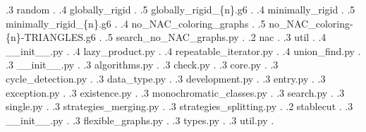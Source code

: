 {	.3 random                               .
	.4 globally\_rigid                      \DTcomment{}.
	.5 globally\_rigid\_\{n\}.g6            .
	.4 minimally\_rigid                     \DTcomment{}.
	.5 minimally\_rigid\_\{n\}.g6           .
	.4 no\_NAC\_coloring\_graphs            .
	.5 no\_NAC\_coloring-\{n\}-TRIANGLES.g6 .
	.5 search\_no\_NAC\_graphs.py           \DTcomment{}.
	.2 nac                                  .
	.3 util                                 .
	.4 \_\_init\_\_.py                      \DTcomment{}.
	.4 lazy\_product.py                     .
	.4 repeatable\_iterator.py              .
	.4 union\_find.py                       .
	.3 \_\_init\_\_.py                      \DTcomment{}.
	.3 algorithms.py                        .
	.3 check.py                             \DTcomment{\IsNACColoring{}}.
	.3 core.py                              \DTcomment{}.
	.3 cycle\_detection.py                  .
	.3 data\_type.py                        \DTcomment{}.
	.3 development.py                       .
	.3 entry.py                             .
	.3 exception.py                         \DTcomment{}.
	.3 existence.py                         .
	.3 monochromatic\_classes.py            .
	.3 search.py                            .
	.3 single.py                            .
	.3 strategies\_merging.py               .
	.3 strategies\_splitting.py             .
	.2 stablecut                            .
	.3 \_\_init\_\_.py                      \DTcomment{}.
	.3 flexible\_graphs.py                  .
	.3 types.py                             \DTcomment{}.
	.3 util.py                              \DTcomment{}.
}
